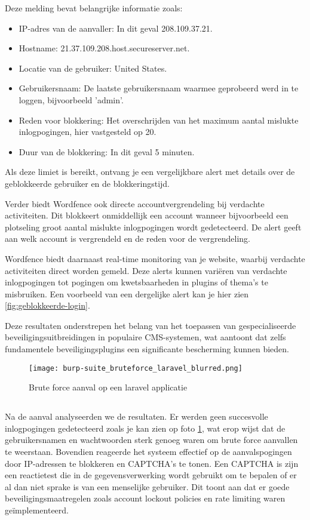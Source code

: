Deze melding bevat belangrijke informatie zoals:
\begin{itemize}
    \item IP-adres van de aanvaller: In dit geval 208.109.37.21.
    \item Hostname: 21.37.109.208.host.secureserver.net.
    \item Locatie van de gebruiker: United States.
    \item Gebruikersnaam: De laatste gebruikersnaam waarmee geprobeerd werd in te loggen, bijvoorbeeld 'admin'.
    \item Reden voor blokkering: Het overschrijden van het maximum aantal mislukte inlogpogingen, hier vastgesteld op 20.
    \item Duur van de blokkering: In dit geval 5 minuten.
\end{itemize}
Als deze limiet is bereikt, ontvang je een vergelijkbare alert met details over de geblokkeerde gebruiker en de 
blokkeringstijd.

Verder biedt Wordfence ook directe accountvergrendeling bij verdachte activiteiten. Dit blokkeert onmiddellijk een 
account wanneer bijvoorbeeld een plotseling groot aantal mislukte inlogpogingen wordt gedetecteerd. De alert geeft 
aan welk account is vergrendeld en de reden voor de vergrendeling.

Wordfence biedt daarnaast real-time monitoring van je website, waarbij verdachte activiteiten direct worden gemeld. 
Deze alerts kunnen variëren van verdachte inlogpogingen tot pogingen om kwetsbaarheden in plugins of thema's te misbruiken.
Een voorbeeld van een dergelijke alert kan je hier zien \ref{fig:geblokkeerde-login}. 

Deze resultaten onderstrepen het belang van het toepassen van gespecialiseerde beveiligingsuitbreidingen in populaire 
CMS-systemen, wat aantoont dat zelfs fundamentele beveiligingsplugins een significante bescherming kunnen bieden.
\begin{figure}
    \centering
    \texttt{[image: burp-suite\_bruteforce\_laravel\_blurred.png]}
    \caption[Brute force aanval op een laravel applicatie]{Brute force aanval op een laravel applicatie}
    \label{fig:laravel-brute-force}
\end{figure}
\subsection{}
Na de aanval analyseerden we de resultaten. Er werden geen succesvolle inlogpogingen gedetecteerd zoals je kan zien op foto \ref{fig:laravel-brute-force}, wat erop wijst dat de 
gebruikersnamen en wachtwoorden sterk genoeg waren om brute force aanvallen te weerstaan. Bovendien reageerde het systeem 
effectief op de aanvalspogingen door IP-adressen te blokkeren en CAPTCHA's te tonen. Een CAPTCHA is zijn een reactietest 
die in de gegevensverwerking wordt gebruikt om te bepalen of er al dan niet sprake is van een menselijke gebruiker. Dit toont aan dat er goede 
beveiligingsmaatregelen zoals account lockout policies en rate limiting waren geïmplementeerd.

